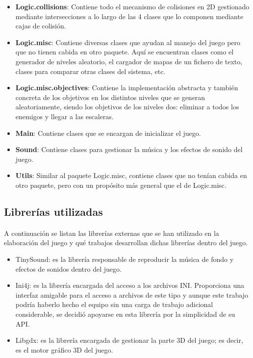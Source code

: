 \documentclass[a4paper]{article}
\begin{document}
\begin{itemize}
	\item \textbf{Logic.collisions}: Contiene todo el mecanismo de colisiones en 2D gestionado mediante intersecciones a lo largo de las 4 clases que lo componen mediante cajas de colisión.
	
	\item \textbf{Logic.misc}: Contiene diversas clases que ayudan al manejo del juego pero que no tienen cabida en otro paquete. Aquí se encuentran clases como el generador de niveles aleatorio, el cargador de mapas de un fichero de texto, clases para comparar otras clases del sistema, etc.
	
	\item \textbf{Logic.misc.objectives}: Contiene la implementación abstracta y también concreta de los objetivos en los distintos niveles que se generan aleatoriamente, siendo los objetivos de los niveles dos: eliminar a todos los enemigos y llegar a las escaleras.
	
	\item \textbf{Main}: Contiene clases que se encargan de inicializar el juego.
	
	\item \textbf{Sound}: Contiene clases para gestionar la música y los efectos de sonido del juego.
	
	\item \textbf{Utils}: Similar al paquete Logic.misc, contiene clases que no tenían cabida en otro paquete, pero con un propósito más general que el de Logic.misc.
\end{itemize}
\subsection{Librerías utilizadas}

\paragraph{}A continuación se listan las librerías externas que se han utilizado en la elaboración del juego y qué trabajos desarrollan dichas librerías dentro del juego.

\begin{itemize}
\item TinySound: es la librería responsable de reproducir la música de fondo y efectos de sonidos dentro del juego.

\item Ini4j: es la librería encargada del acceso a los archivos INI. Proporciona una interfaz amigable para el acceso a archivos de este tipo y aunque este trabajo podría haberlo hecho el equipo sin una carga de trabajo adicional considerable, se decidió apoyarse en esta librería por la simplicidad de su API.

\item Libgdx: es la librería encargada de gestionar la parte 3D del juego; es decir, es el motor gráfico 3D del juego.
\end{itemize}
\end{document}
